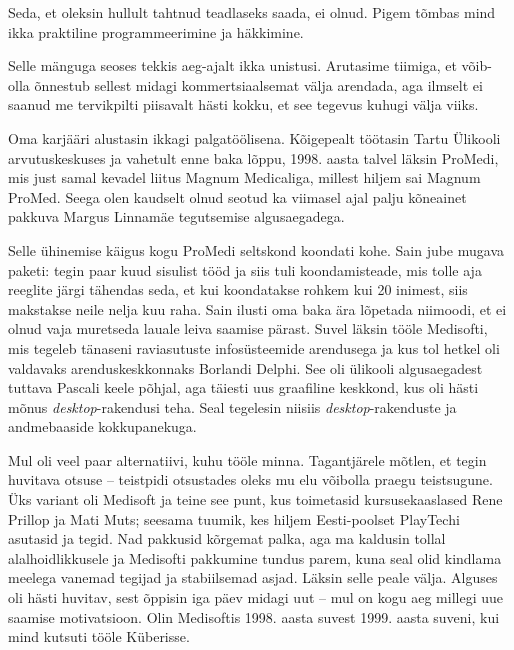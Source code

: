 
Seda, et oleksin hullult tahtnud teadlaseks saada, ei olnud. Pigem tõmbas mind ikka
praktiline programmeerimine ja häkkimine. 


Selle mänguga seoses tekkis aeg-ajalt ikka unistusi. Arutasime tiimiga, et võib-olla õnnestub sellest midagi kommertsiaalsemat 
välja arendada, 
aga ilmselt ei saanud me tervikpilti piisavalt hästi 
kokku, et see tegevus kuhugi välja 
viiks. 

Oma karjääri alustasin ikkagi palgatöölisena. Kõigepealt töötasin Tartu Ülikooli arvutuskeskuses ja
vahetult enne baka lõppu, 1998. aasta talvel läksin
ProMedi, mis just samal kevadel liitus Magnum 
Medicaliga, millest hiljem sai Magnum ProMed. Seega
olen kaudselt olnud seotud ka viimasel ajal palju kõneainet pakkuva 
Margus Linnamäe tegutsemise algusaegadega. 

Selle ühinemise käigus kogu ProMedi seltskond koondati kohe. 
Sain jube mugava paketi: tegin paar kuud sisulist tööd ja siis tuli 
koondamisteade, mis tolle aja reeglite järgi tähendas seda, et kui koondatakse 
rohkem kui 20 inimest, siis makstakse neile nelja kuu raha. Sain ilusti 
oma baka ära lõpetada niimoodi, et ei olnud vaja 
muretseda lauale leiva saamise pärast. Suvel läksin tööle
Medisofti, mis tegeleb tänaseni raviasutuste 
infosüsteemide arendusega ja kus tol hetkel oli valdavaks arenduskeskkonnaks 
Borlandi Delphi. See oli ülikooli algusaegadest 
tuttava Pascali keele põhjal, aga täiesti uus graafiline keskkond, kus oli hästi mõnus 
\emph{desktop}-rakendusi teha. Seal tegelesin niisiis
\emph{desktop}-rakenduste ja andmebaaside kokkupanekuga. 

Mul oli veel paar alternatiivi, kuhu tööle 
minna. Tagantjärele mõtlen, et tegin huvitava otsuse -- 
teistpidi otsustades oleks mu elu võibolla praegu teistsugune. Üks variant oli Medisoft ja teine see punt, kus toimetasid kursusekaaslased Rene Prillop 
ja Mati Muts; seesama 
tuumik, kes hiljem Eesti-poolset PlayTechi asutasid ja 
tegid. Nad pakkusid kõrgemat palka, aga ma kaldusin tollal
alalhoidlikkusele ja Medisofti pakkumine tundus parem, kuna seal olid kindlama meelega
vanemad tegijad ja stabiilsemad asjad. Läksin 
selle peale välja. Alguses oli hästi huvitav, sest õppisin
iga päev midagi uut -- mul on kogu aeg millegi uue saamise 
motivatsioon. Olin Medisoftis 1998. aasta suvest 1999. aasta suveni, 
kui mind kutsuti tööle Küberisse. 

